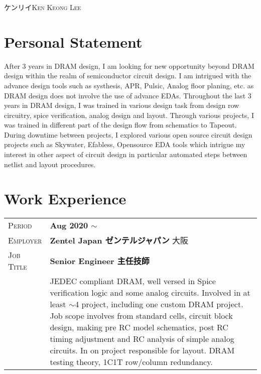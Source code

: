\documentclass[a4paper, oneside, final]{scrartcl} %
\newcommand{\gray}{\rowcolor[gray]{.90}} %
\begin{document}
\begin{center} %


{\fontsize{24}{12}\selectfont\scshape ケンリイKen Keong Lee } %

\vspace{0.2cm} %

\section{Personal Statement}

\footnotesize{After 3 years in DRAM design, I am looking for new opportunity beyond DRAM design within the realm of semiconductor circuit design. I am intrigued with the advance design tools such as systhesis, APR, Pulsic, Analog floor planing, etc. as DRAM design does not involve the use of advance EDAs. Throughout the last 3 years in DRAM design, I was trained in various design task from design row circuitry, spice verification, analog design and layout. Through various projects, I was trained in different part of the design flow from schematics to Tapeout. During downtime between projects, I explored various open source circuit design projects such as Skywater, Efabless, Opensource EDA tools which intrigue my interest in other aspect of circuit design in particular automated steps between netlist and layout procedures.}


\section{Work Experience}

\begin{tabularx}{0.97\linewidth}{>{\raggedleft\scshape}p{2cm}X}
\gray Period & \textbf{Aug 2020 $\sim$}\\
\gray Employer & \textbf{Zentel Japan ゼンテルジャパン} \hfill 大阪\\
\gray Job Title & \textbf{Senior Engineer 主任技師}\\
& \footnotesize{JEDEC compliant DRAM, well versed in Spice verification logic and some analog circuits. Involved in at least $\sim$4 project, including one custom DRAM project. Job scope involves from standard cells, circuit block design, making pre RC model schematics, post RC timing adjustment and RC analysis of simple analog circuits. In on project responsible for layout. DRAM testing theory, 1C1T row/column redundancy.}
\end{tabularx}


\end{center}
\end{document}
